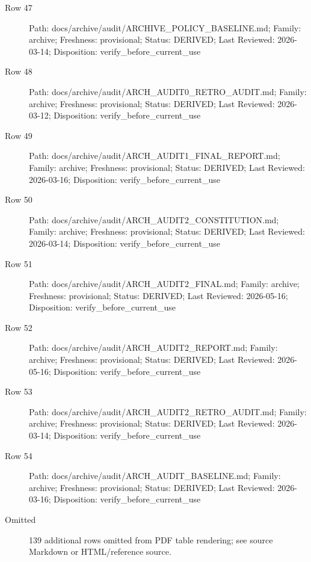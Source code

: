 \documentclass[10.5pt,a4paper,openany]{book}
\begin{document}
\begin{description}
\item[Row 47] Path: docs/\allowbreak{}archive/\allowbreak{}audit/\allowbreak{}ARCHIVE\_\allowbreak{}POLICY\_\allowbreak{}BASELINE.\allowbreak{}md; Family: archive; Freshness: provisional; Status: DERIVED; Last Reviewed: 2026-\allowbreak{}03-\allowbreak{}14; Disposition: verify\_\allowbreak{}before\_\allowbreak{}current\_\allowbreak{}use
\item[Row 48] Path: docs/\allowbreak{}archive/\allowbreak{}audit/\allowbreak{}ARCH\_\allowbreak{}AUDIT0\_\allowbreak{}RETRO\_\allowbreak{}AUDIT.\allowbreak{}md; Family: archive; Freshness: provisional; Status: DERIVED; Last Reviewed: 2026-\allowbreak{}03-\allowbreak{}12; Disposition: verify\_\allowbreak{}before\_\allowbreak{}current\_\allowbreak{}use
\item[Row 49] Path: docs/\allowbreak{}archive/\allowbreak{}audit/\allowbreak{}ARCH\_\allowbreak{}AUDIT1\_\allowbreak{}FINAL\_\allowbreak{}REPORT.\allowbreak{}md; Family: archive; Freshness: provisional; Status: DERIVED; Last Reviewed: 2026-\allowbreak{}03-\allowbreak{}16; Disposition: verify\_\allowbreak{}before\_\allowbreak{}current\_\allowbreak{}use
\item[Row 50] Path: docs/\allowbreak{}archive/\allowbreak{}audit/\allowbreak{}ARCH\_\allowbreak{}AUDIT2\_\allowbreak{}CONSTITUTION.\allowbreak{}md; Family: archive; Freshness: provisional; Status: DERIVED; Last Reviewed: 2026-\allowbreak{}03-\allowbreak{}14; Disposition: verify\_\allowbreak{}before\_\allowbreak{}current\_\allowbreak{}use
\item[Row 51] Path: docs/\allowbreak{}archive/\allowbreak{}audit/\allowbreak{}ARCH\_\allowbreak{}AUDIT2\_\allowbreak{}FINAL.\allowbreak{}md; Family: archive; Freshness: provisional; Status: DERIVED; Last Reviewed: 2026-\allowbreak{}05-\allowbreak{}16; Disposition: verify\_\allowbreak{}before\_\allowbreak{}current\_\allowbreak{}use
\item[Row 52] Path: docs/\allowbreak{}archive/\allowbreak{}audit/\allowbreak{}ARCH\_\allowbreak{}AUDIT2\_\allowbreak{}REPORT.\allowbreak{}md; Family: archive; Freshness: provisional; Status: DERIVED; Last Reviewed: 2026-\allowbreak{}05-\allowbreak{}16; Disposition: verify\_\allowbreak{}before\_\allowbreak{}current\_\allowbreak{}use
\item[Row 53] Path: docs/\allowbreak{}archive/\allowbreak{}audit/\allowbreak{}ARCH\_\allowbreak{}AUDIT2\_\allowbreak{}RETRO\_\allowbreak{}AUDIT.\allowbreak{}md; Family: archive; Freshness: provisional; Status: DERIVED; Last Reviewed: 2026-\allowbreak{}03-\allowbreak{}14; Disposition: verify\_\allowbreak{}before\_\allowbreak{}current\_\allowbreak{}use
\item[Row 54] Path: docs/\allowbreak{}archive/\allowbreak{}audit/\allowbreak{}ARCH\_\allowbreak{}AUDIT\_\allowbreak{}BASELINE.\allowbreak{}md; Family: archive; Freshness: provisional; Status: DERIVED; Last Reviewed: 2026-\allowbreak{}03-\allowbreak{}16; Disposition: verify\_\allowbreak{}before\_\allowbreak{}current\_\allowbreak{}use
\item[Omitted] 139 additional rows omitted from PDF table rendering; see source Markdown or HTML/\allowbreak{}reference source.\allowbreak{}
\end{description}
\end{document}
